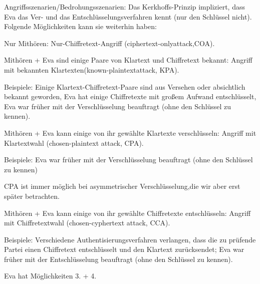 \documentclass[a4paper]{article}
\begin{document}
\begin{multicols}{3}
    Angriffsszenarien/Bedrohungsszenarien:
    Das Kerkhoffs-Prinzip impliziert, dass Eva das Ver- und das Entschlüsselungsverfahren kennt (nur den Schlüssel nicht). Folgende Möglichkeiten kann sie weiterhin haben:
    \begin{enumerate*}
        \item Nur Mithören: Nur-Chiffretext-Angriff (ciphertext-onlyattack,COA).
        \item  Mithören + Eva sind einige Paare von Klartext und Chiffretext bekannt: Angriff mit bekannten Klartexten(known-plaintextattack, KPA).
        \begin{itemize*}
            \item Beispiele: Einige Klartext-Chiffretext-Paare sind aus Versehen oder absichtlich bekannt geworden, Eva hat einige Chiffretexte mit großem Aufwand entschlüsselt, Eva war früher mit der Verschlüsselung beauftragt (ohne den Schlüssel zu kennen).
        \end{itemize*}
        \item  Mithören + Eva kann einige von ihr gewählte Klartexte verschlüsseln: Angriff mit Klartextwahl (chosen-plaintext attack, CPA).
        \begin{itemize*}
            \item Beispiele: Eva war früher mit der Verschlüsselung beauftragt (ohne den Schlüssel zu kennen)
            \item CPA ist immer möglich bei asymmetrischer Verschlüsselung,die wir aber erst später betrachten.
        \end{itemize*}
        \item Mithören + Eva kann einige von ihr gewählte Chiffretexte entschlüsseln: Angriff mit Chiffretextwahl (chosen-cyphertext attack, CCA).
        \begin{itemize*}
            \item Beispiele: Verschiedene Authentisierungsverfahren verlangen, dass die zu prüfende Partei einen Chiffretext entschlüsselt und den Klartext zurücksendet; Eva war früher mit der Entschlüsselung beauftragt (ohne den Schlüssel zu kennen).
        \end{itemize*}
        \item  Eva hat Möglichkeiten 3. + 4.
    \end{enumerate*}


\end{multicols}
\end{document}
